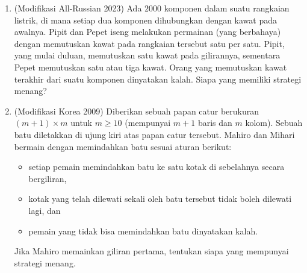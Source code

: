 \documentclass[11pt]{scrartcl}
\begin{document}
\begin{enumerate}[resume]


\item
(Modifikasi All-Russian 2023) Ada $2000$ komponen dalam suatu rangkaian listrik, di mana setiap dua komponen dihubungkan dengan kawat pada awalnya. Pipit dan Pepet iseng melakukan permainan (yang berbahaya) dengan memutuskan kawat pada rangkaian tersebut satu per satu. Pipit, yang mulai duluan, memutuskan satu kawat pada gilirannya, sementara Pepet memutuskan satu atau tiga kawat. Orang yang memutuskan kawat terakhir dari suatu komponen dinyatakan kalah. Siapa yang memiliki strategi menang?




\item
    (Modifikasi Korea 2009) Diberikan sebuah papan catur berukuran $(m+1) \times m$ untuk $m \ge 10$ (mempunyai $m+1$ baris dan $m$ kolom). Sebuah batu diletakkan di ujung kiri atas papan catur tersebut. Mahiro dan Mihari bermain dengan memindahkan batu sesuai aturan berikut:
    \begin{itemize}
        \item setiap pemain memindahkan batu ke satu kotak di sebelahnya secara bergiliran,
        \item kotak yang telah dilewati sekali oleh batu tersebut tidak boleh dilewati lagi, dan
        \item pemain yang tidak bisa memindahkan batu dinyatakan kalah.
    \end{itemize}
    Jika Mahiro memainkan giliran pertama, tentukan siapa yang mempunyai strategi menang.



\end{enumerate}
\end{document}
